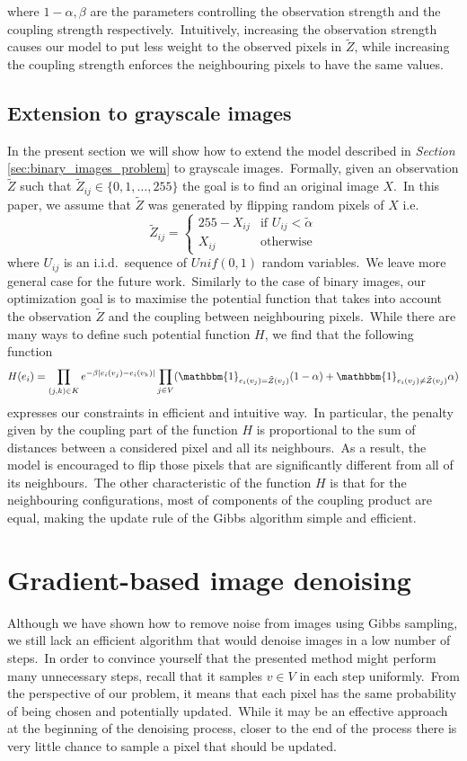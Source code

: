 \documentclass[shortabstract, english, lic]{iithesis}
\newcommand\numberedchapter[1]{\setlength\topskip{3cm}\chapter{#1}\setlength\topskip{0cm}}
\theoremstyle{default_theorem_style}\newtheorem{theorem}{Theorem}
\theoremstyle{default_theorem_style}\newtheorem{definition}{Definition}
\begin{document}
\noindent where $1 - \alpha, \beta$ are the parameters controlling the observation strength and the coupling strength
respectively.\ Intuitively, increasing the observation strength causes our model to put less weight to the
observed pixels in $\tilde{Z}$, while increasing the coupling strength enforces the neighbouring pixels to have the
same values.

\section{Extension to grayscale images}

In the present section we will show how to extend the model described in \textit{Section}
\ref{sec:binary_images_problem} to grayscale images.\ Formally, given an observation $\tilde{Z}$ such
that $\tilde{Z}_{ij} \in \{0, 1, \dots, 255\}$ the goal is to find an original image $X$.\ In this paper, we assume
that $\tilde{Z}$ was generated by flipping random pixels of $X$ i.e.
$$
\tilde{Z}_{ij} =
\begin{cases}
  255 - X_{ij} &\text{if $U_{ij} < \tilde{\alpha}$}\\
  X_{ij} &\text{otherwise}
\end{cases}
$$
where $U_{ij}$ is an i.i.d.\ sequence of $Unif(0, 1)$ random variables.\ We leave more general case for the future
work.\ Similarly to the case of binary images, our optimization goal is to maximise the potential function that
takes into account the observation $\tilde{Z}$ and the coupling between neighbouring pixels.\ While there are many
ways to define such potential function $H$, we find that the following function
$$
H(e_i) = \prod\limits_{(j, k) \in K} e^{-\beta |e_i(v_j) - e_i(v_k)|}
\prod\limits_{j \in V}(\mathbbm{1}_{e_i(v_j) = \tilde{Z}(v_j)}(1 - \alpha) +
\mathbbm{1}_{e_i(v_j) \neq \tilde{Z}(v_j)}\alpha)
$$
expresses our constraints in efficient and intuitive way.\ In particular, the penalty given by the coupling part of
the function $H$ is proportional to the sum of distances between a considered pixel and all its neighbours.\ As a
result, the model is encouraged to flip those pixels that are significantly different from all of its
neighbours.\ The other characteristic of the function $H$ is that for the neighbouring configurations, most of
components of the coupling product are equal, making the update rule of the Gibbs algorithm simple and efficient.

\numberedchapter{Gradient-based image denoising}

Although we have shown how to remove noise from images using Gibbs sampling, we still lack an efficient algorithm
that would denoise images in a low number of steps.\ In order to convince yourself that the presented method
might perform many unnecessary steps, recall that it samples $v \in V$ in each step uniformly.\ From the perspective
of our problem, it means that each pixel has the same probability of being chosen and potentially updated.\ While
it may be an effective approach at the beginning of the denoising process, closer to the end of the process there is
very little chance to sample a pixel that should be updated.\newline
\end{document}
